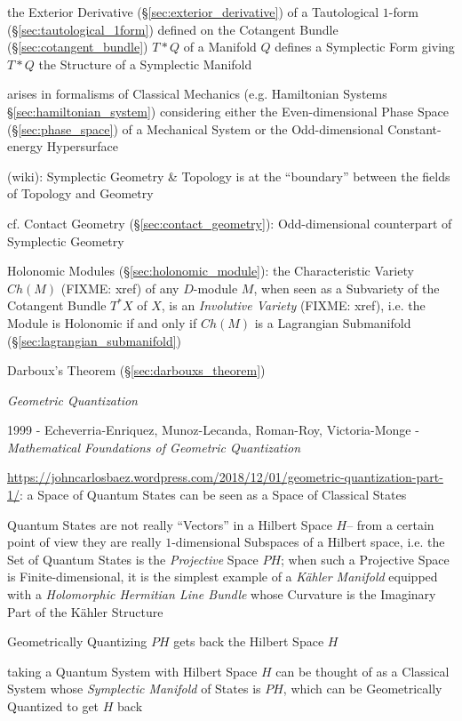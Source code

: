 the Exterior Derivative (\S\ref{sec:exterior_derivative}) of a Tautological
$1$-form (\S\ref{sec:tautological_1form}) defined on the Cotangent Bundle
(\S\ref{sec:cotangent_bundle}) $T * Q$ of a Manifold $Q$ defines a Symplectic
Form giving $T * Q$ the Structure of a Symplectic Manifold

arises in formalisms of Classical Mechanics (e.g. Hamiltonian Systems
\S\ref{sec:hamiltonian_system}) considering either the Even-dimensional Phase
Space (\S\ref{sec:phase_space}) of a Mechanical System or the Odd-dimensional
Constant-energy Hypersurface

(wiki): Symplectic Geometry \& Topology is at the ``boundary'' between the
fields of Topology and Geometry

\fist cf. Contact Geometry (\S\ref{sec:contact_geometry}): Odd-dimensional
counterpart of Symplectic Geometry

\fist Holonomic Modules (\S\ref{sec:holonomic_module}): the Characteristic
Variety $Ch(M)$ (FIXME: xref) of any $D$-module $M$, when seen as a Subvariety
of the Cotangent Bundle $T^*X$ of $X$, is an \emph{Involutive Variety} (FIXME:
xref), i.e. the Module is Holonomic if and only if $Ch(M)$ is a Lagrangian
Submanifold (\S\ref{sec:lagrangian_submanifold})

Darboux's Theorem (\S\ref{sec:darbouxs_theorem})

\emph{Geometric Quantization}

1999 - Echeverria-Enriquez, Munoz-Lecanda, Roman-Roy, Victoria-Monge -
\emph{Mathematical Foundations of Geometric Quantization}

\url{https://johncarlosbaez.wordpress.com/2018/12/01/geometric-quantization-part-1/}:
a Space of Quantum States can be seen as a Space of Classical States

Quantum States are not really ``Vectors'' in a Hilbert Space $H$-- from a
certain point of view they are really $1$-dimensional Subspaces of a Hilbert
space, i.e. the Set of Quantum States is the \emph{Projective} Space $P H$; when
such a Projective Space is Finite-dimensional, it is the simplest example of a
\emph{K\"ahler Manifold} equipped with a \emph{Holomorphic Hermitian Line
  Bundle} whose Curvature is the Imaginary Part of the K\"ahler Structure

Geometrically Quantizing $PH$ gets back the Hilbert Space $H$

taking a Quantum System with Hilbert Space $H$ can be thought of as a Classical
System whose \emph{Symplectic Manifold} of States is $P H$, which can be
Geometrically Quantized to get $H$ back

